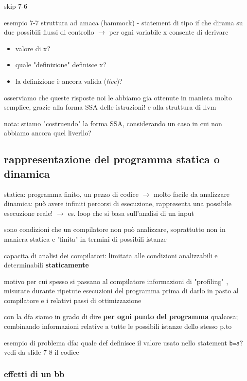 skip 7-6

esempio 7-7 struttura ad amaca (hammock) - statement di tipo if che dirama su due possibili flussi di controllo $\rightarrow$ per ogni variabile x consente di derivare
\begin{itemize}
  \item valore di x?
  \item quale "definizione" definisce x?
  \item la definizione \`e ancora valida (\textit{live})?
\end{itemize}

osserviamo che queste risposte noi le abbiamo gia ottenute in maniera molto semplice, grazie alla forma SSA delle istruzioni! e alla struttura di llvm

nota: stiamo "costruendo" la forma SSA, considerando un caso in cui non abbiamo ancora quel liverllo?

\subsection{rappresentazione del programma statica o dinamica}

statica: programma finito, un pezzo di codice $\rightarrow$ molto facile da analizzare
dinamica: pu\`o avere infiniti percorsi di esecuzione, rappresenta una possibile esecuzione reale! $\rightarrow$ es. loop che si basa sull'analisi di un input

sono condizioni che un compilatore non pu\`o analizzare, soprattutto non in maniera statica e "finita" in termini di possibili istanze

\begin{emphasize}
    capacita di analisi dei compilatori: limitata alle condizioni analizzabili e determinabili \textbf{staticamente}

    motivo per cui spesso si passano al compilatore informazioni di "profiling" , misurate durante ripetute esecuzioni del programma prima di darlo in pasto al compilatore e i relativi passi di ottimizzazione
\end{emphasize}

con la dfa siamo in grado di dire \textbf{per ogni punto del programma} qualcosa; combinando informazioni relative a tutte le possibili istanze dello stesso p.to

esempio di problema dfa: quale def definisce il valore usato nello statement \lstinline|b=a|? vedi da slide 7-8 il codice

\subsubsection{effetti di un bb}

